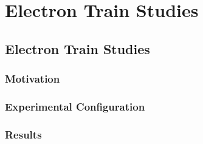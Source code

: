 \chapter{Electron Train Studies}
\label{ch:etrains} 

\section{Electron Train Studies}
\subsection{Motivation}
\subsection{Experimental Configuration}
\subsection{Results}


